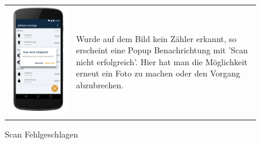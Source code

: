 \begin{figure}[h]
\begin{tabularx}{\textwidth}{X  X}
	\includegraphics[scale = 0.155]{img/AndroidMockup/imageFailed} \caption{Scan Fehlgeschlagen} & Wurde auf dem Bild kein Zähler erkannt, so erscheint eine Popup Benachrichtung mit 'Scan nicht erfolgreich'. Hier hat man die Möglichkeit erneut ein Foto zu machen oder den Vorgang abzubrechen. \\

\end{tabularx}
\end{figure}
